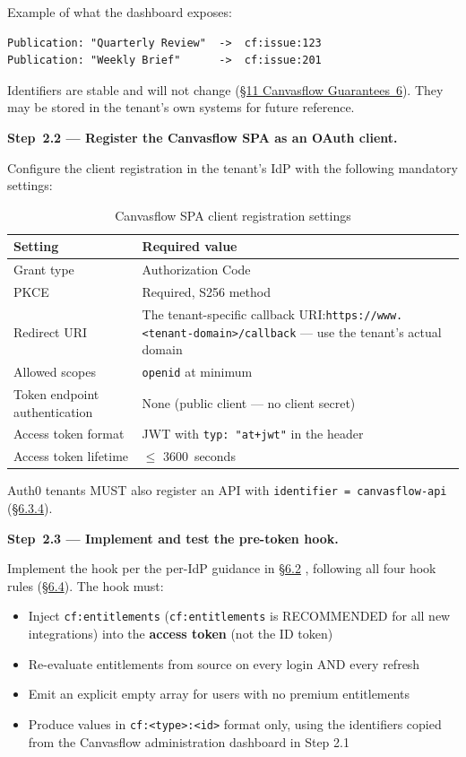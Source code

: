 Example of what the dashboard exposes:

\begin{lstlisting}
Publication: "Quarterly Review"  ->  cf:issue:123
Publication: "Weekly Brief"      ->  cf:issue:201
\end{lstlisting}

Identifiers are stable and will not change (\hyperref[sec:canvasflow-guarantees]{\S11 Canvasflow Guarantees~6}). 
They may be stored in the tenant's own systems for future reference.

\textbf{Step~2.2 --- Register the Canvasflow SPA as an OAuth client.}

Configure the client registration in the tenant's IdP with the following mandatory
settings:

\begin{table}[htbp]
\centering
\begin{tabularx}{\textwidth}{@{}lX@{}}
\toprule
\textbf{Setting} & \textbf{Required value} \\
\midrule
Grant type & Authorization Code \\
PKCE & Required, S256 method \\
Redirect URI & The tenant-specific callback URI:\texttt{https://www.<tenant-domain>/callback} — use the tenant's actual domain \\
Allowed scopes & \texttt{openid} at minimum \\
Token endpoint authentication & None (public client --- no client secret) \\
Access token format & JWT with \texttt{typ: "at+jwt"} in the header \\
Access token lifetime & $\leq$ 3600~seconds \\
\bottomrule
\end{tabularx}
\caption{Canvasflow SPA client registration settings}
\end{table}

Auth0 tenants MUST also register an API with \texttt{identifier = canvasflow-api}
(\hyperref[sec:api-registration-required]{\S6.3.4}).



\textbf{Step~2.3 --- Implement and test the pre-token hook.}



Implement the hook per the per-IdP guidance in \hyperref[sec:per-idp-implementation]{\S6.2} ,
following all four hook rules (\hyperref[sec:hook-rules]{\S6.4}). The hook must:
\begin{itemize}
  \item Inject \texttt{cf:entitlements} (\texttt{cf:entitlements} is RECOMMENDED 
  for all new integrations) into the
    \textbf{access token} (not the ID token)
  \item Re-evaluate entitlements from source on every login AND every refresh
  \item Emit an explicit empty array for users with no premium entitlements
  \item Produce values in \texttt{cf:<type>:<id>} format only, using the identifiers 
  copied from the Canvasflow administration dashboard in Step 2.1
\end{itemize}

